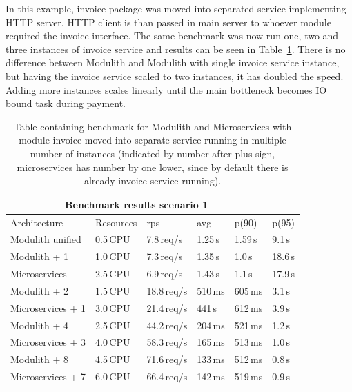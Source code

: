 In this example, invoice package was moved into separated service implementing HTTP server. HTTP client is than passed in main server to whoever module required the invoice interface. The same benchmark was now run one, two and three instances of invoice service and results can be seen in Table~\ref{table:benchmark_modulith_instances}. There is no difference between Modulith and Modulith with single invoice service instance, but having the invoice service scaled to two instances, it has doubled the speed. Adding more instances scales linearly until the main bottleneck becomes IO bound task during payment.

\begin{table}
    \begin{tabular}{ |p{3cm}||p{3cm}|p{1.5cm}|p{1.5cm}|p{1.5cm}|p{1.5cm}| }
        \hline
        \multicolumn{5}{|c|}{Benchmark results scenario 1}                         \\
        \hline
        Architecture       & Resources & rps         & avg     & p(90)   & p(95)   \\
        \hline
        Modulith unified   & 0.5\,CPU  & 7.8\,req/s  & 1.25\,s & 1.59\,s & 9.1\,s  \\
        \rowcolor{Gray}
        Modulith + 1       & 1.0\,CPU  & 7.3\,req/s  & 1.35\,s & 1.0\,s  & 18.6\,s \\
        \rowcolor{Gray}
        Microservices      & 2.5\,CPU  & 6.9\,req/s  & 1.43\,s & 1.1\,s  & 17.9\,s \\
        Modulith + 2       & 1.5\,CPU  & 18.8\,req/s & 510\,ms & 605\,ms & 3.1\,s  \\
        Microservices  + 1 & 3.0\,CPU  & 21.4\,req/s & 441\,s  & 612\,ms & 3.9\,s  \\
        \rowcolor{Gray}
        Modulith + 4       & 2.5\,CPU  & 44.2\,req/s & 204\,ms & 521\,ms & 1.2\,s  \\
        \rowcolor{Gray}
        Microservices  + 3 & 4.0\,CPU  & 58.3\,req/s & 165\,ms & 513\,ms & 1.0\,s  \\
        Modulith + 8       & 4.5\,CPU  & 71.6\,req/s & 133\,ms & 512\,ms & 0.8\,s  \\
        Microservices  + 7 & 6.0\,CPU  & 66.4\,req/s & 142\,ms & 519\,ms & 0.9\,s  \\
        \hline
    \end{tabular}
    \caption{Table containing benchmark for Modulith and Microservices with module invoice moved into separate service running in multiple number of instances (indicated by number after plus sign, microservices has number by one lower, since by default there is already invoice service running).\label{table:benchmark_modulith_instances}}
\end{table}

